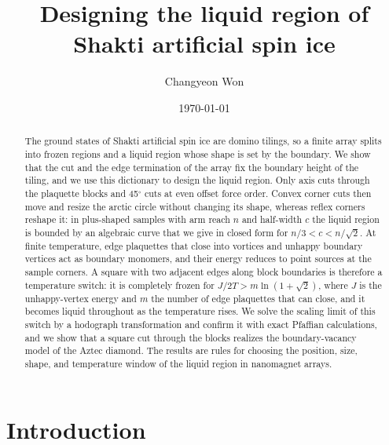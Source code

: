\documentclass[reprint,aps,prb,floatfix,longbibliography,amsmath,amssymb]{revtex4-2}
\begin{document}
\title{Designing the liquid region of Shakti artificial spin ice}

\author{Changyeon Won}

\date{\today}

\begin{abstract}
The ground states of Shakti artificial spin ice are domino tilings, so a finite array splits into frozen regions and a liquid region whose shape is set by the boundary. We show that the cut and the edge termination of the array fix the boundary height of the tiling, and we use this dictionary to design the liquid region. Only axis cuts through the plaquette blocks and 45$^\circ$ cuts at even offset force order. Convex corner cuts then move and resize the arctic circle without changing its shape, whereas reflex corners reshape it: in plus-shaped samples with arm reach $n$ and half-width $c$ the liquid region is bounded by an algebraic curve that we give in closed form for $n/3<c<n/\sqrt2$. At finite temperature, edge plaquettes that close into vortices and unhappy boundary vertices act as boundary monomers, and their energy reduces to point sources at the sample corners. A square with two adjacent edges along block boundaries is therefore a temperature switch: it is completely frozen for $J/2T>m\ln(1+\sqrt2)$, where $J$ is the unhappy-vertex energy and $m$ the number of edge plaquettes that can close, and it becomes liquid throughout as the temperature rises. We solve the scaling limit of this switch by a hodograph transformation and confirm it with exact Pfaffian calculations, and we show that a square cut through the blocks realizes the boundary-vacancy model of the Aztec diamond. The results are rules for choosing the position, size, shape, and temperature window of the liquid region in nanomagnet arrays.
\end{abstract}

\maketitle

\section{Introduction}\label{sec:intro}
\end{document}
